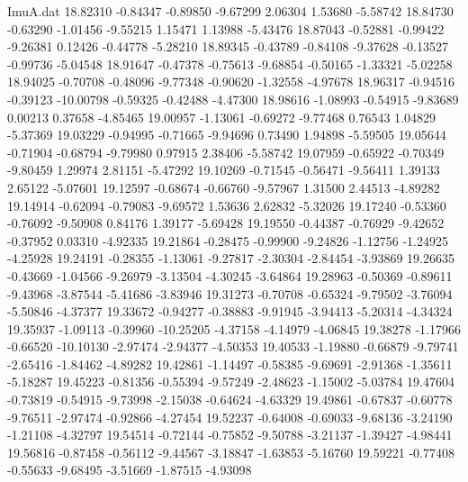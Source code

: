 \begin{filecontents}{ImuA.dat}
  18.82310   -0.84347   -0.89850   -9.67299    2.06304    1.53680   -5.58742
  18.84730   -0.63290   -1.01456   -9.55215    1.15471    1.13988   -5.43476
  18.87043   -0.52881   -0.99422   -9.26381    0.12426   -0.44778   -5.28210
  18.89345   -0.43789   -0.84108   -9.37628   -0.13527   -0.99736   -5.04548
  18.91647   -0.47378   -0.75613   -9.68854   -0.50165   -1.33321   -5.02258
  18.94025   -0.70708   -0.48096   -9.77348   -0.90620   -1.32558   -4.97678
  18.96317   -0.94516   -0.39123  -10.00798   -0.59325   -0.42488   -4.47300
  18.98616   -1.08993   -0.54915   -9.83689    0.00213    0.37658   -4.85465
  19.00957   -1.13061   -0.69272   -9.77468    0.76543    1.04829   -5.37369
  19.03229   -0.94995   -0.71665   -9.94696    0.73490    1.94898   -5.59505
  19.05644   -0.71904   -0.68794   -9.79980    0.97915    2.38406   -5.58742
  19.07959   -0.65922   -0.70349   -9.80459    1.29974    2.81151   -5.47292
  19.10269   -0.71545   -0.56471   -9.56411    1.39133    2.65122   -5.07601
  19.12597   -0.68674   -0.66760   -9.57967    1.31500    2.44513   -4.89282
  19.14914   -0.62094   -0.79083   -9.69572    1.53636    2.62832   -5.32026
  19.17240   -0.53360   -0.76092   -9.50908    0.84176    1.39177   -5.69428
  19.19550   -0.44387   -0.76929   -9.42652   -0.37952    0.03310   -4.92335
  19.21864   -0.28475   -0.99900   -9.24826   -1.12756   -1.24925   -4.25928
  19.24191   -0.28355   -1.13061   -9.27817   -2.30304   -2.84454   -3.93869
  19.26635   -0.43669   -1.04566   -9.26979   -3.13504   -4.30245   -3.64864
  19.28963   -0.50369   -0.89611   -9.43968   -3.87544   -5.41686   -3.83946
  19.31273   -0.70708   -0.65324   -9.79502   -3.76094   -5.50846   -4.37377
  19.33672   -0.94277   -0.38883   -9.91945   -3.94413   -5.20314   -4.34324
  19.35937   -1.09113   -0.39960  -10.25205   -4.37158   -4.14979   -4.06845
  19.38278   -1.17966   -0.66520  -10.10130   -2.97474   -2.94377   -4.50353
  19.40533   -1.19880   -0.66879   -9.79741   -2.65416   -1.84462   -4.89282
  19.42861   -1.14497   -0.58385   -9.69691   -2.91368   -1.35611   -5.18287
  19.45223   -0.81356   -0.55394   -9.57249   -2.48623   -1.15002   -5.03784
  19.47604   -0.73819   -0.54915   -9.73998   -2.15038   -0.64624   -4.63329
  19.49861   -0.67837   -0.60778   -9.76511   -2.97474   -0.92866   -4.27454
  19.52237   -0.64008   -0.69033   -9.68136   -3.24190   -1.21108   -4.32797
  19.54514   -0.72144   -0.75852   -9.50788   -3.21137   -1.39427   -4.98441
  19.56816   -0.87458   -0.56112   -9.44567   -3.18847   -1.63853   -5.16760
  19.59221   -0.77408   -0.55633   -9.68495   -3.51669   -1.87515   -4.93098

\end{filecontents}
